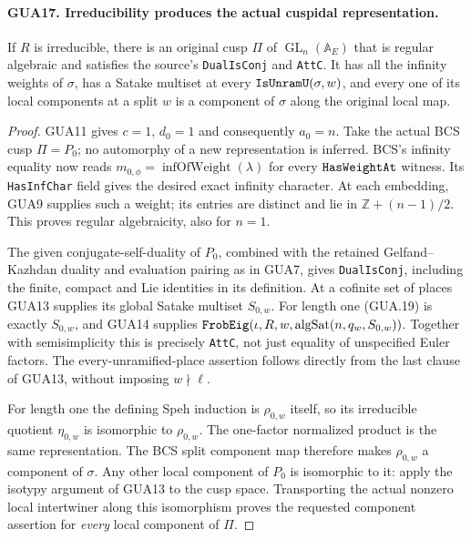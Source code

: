 \documentclass[11pt,a4paper]{article}
\numberwithin{equation}{section}
\theoremstyle{remark}\newtheorem{remark}[theorem]{Remark}
\begin{document}
\paragraph{GUA17. Irreducibility produces the actual cuspidal representation.}
\label{claim:GUA17}
If $R$ is irreducible, there is an original cusp
$\Pi$ of $\operatorname{GL}_n(\mathbb A_E)$ that is
regular algebraic and satisfies the source's
\texttt{Dual\allowbreak Is\allowbreak Conj} and \texttt{Att\allowbreak C}.  It has
all the infinity weights of $\sigma$, has a
Satake multiset at every
$\texttt{Is\allowbreak Unram\allowbreak U}(\sigma,w)$, and every one of
its local components at a split $w$ is a component
of $\sigma$ along the original local map.
\begin{proof}
GUA11 gives $c=1$, $d_0=1$ and consequently $a_0=n$.
Take the actual BCS cusp $\Pi=P_0$; no automorphy
of a new representation is inferred.  BCS's
infinity equality now reads
$m_{0,\phi}=\operatorname{infOfWeight}(\lambda)$
for every $\texttt{Has\allowbreak Weight\allowbreak At}$ witness.  Its
\texttt{Has\allowbreak Inf\allowbreak Char} field gives the desired exact
infinity character.  At each embedding, GUA9
supplies such a weight; its entries are distinct
and lie in $\mathbb Z+(n-1)/2$.  This proves
regular algebraicity, also for $n=1$.

The given conjugate-self-duality of $P_0$, combined
with the retained Gelfand--Kazhdan duality and
evaluation pairing as in GUA7, gives
\texttt{Dual\allowbreak Is\allowbreak Conj}, including the finite, compact
and Lie identities in its definition.  At a
cofinite set of places GUA13 supplies its global
Satake multiset $S_{0,w}$.  For length one (GUA.19)
is exactly $S_{0,w}$, and GUA14 supplies
$\texttt{Frob\allowbreak Eig}(\iota,R,w,
\operatorname{algSat}(n,q_w,S_{0,w}))$.
Together with semisimplicity this is precisely
\texttt{Att\allowbreak C}, not just equality of unspecified
Euler factors.  The every-unramified-place
assertion follows directly from the last clause
of GUA13, without imposing $w\nmid\ell$.

For length one the defining Speh induction is
$\rho_{0,w}$ itself, so its irreducible quotient
$\eta_{0,w}$ is isomorphic to $\rho_{0,w}$.
The one-factor normalized product is the same
representation.  The BCS split component map
therefore makes $\rho_{0,w}$ a component of
$\sigma$.  Any other local component of $P_0$
is isomorphic to it: apply the isotypy argument
of GUA13 to the cusp space.  Transporting the
actual nonzero local intertwiner along this
isomorphism proves the requested component
assertion for \emph{every} local component of $\Pi$.
\end{proof}
\end{document}
